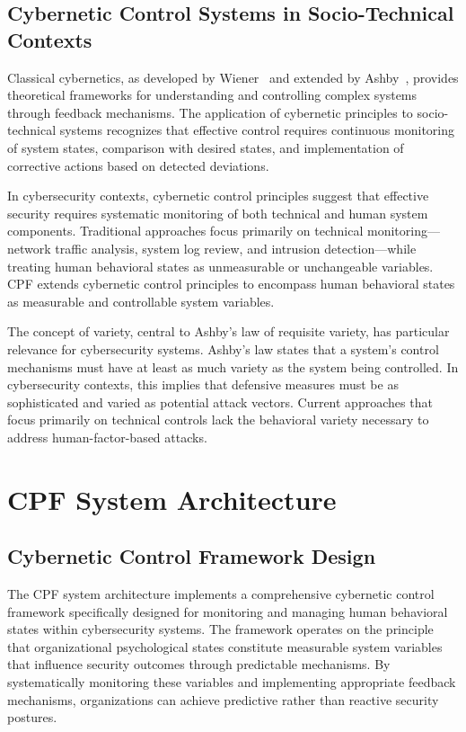 \documentclass[journal]{IEEEtran}
\begin{document}
\subsection{Cybernetic Control Systems in Socio-Technical Contexts}

Classical cybernetics, as developed by Wiener~\cite{wiener1948} and extended by Ashby~\cite{ashby1956}, provides theoretical frameworks for understanding and controlling complex systems through feedback mechanisms. The application of cybernetic principles to socio-technical systems recognizes that effective control requires continuous monitoring of system states, comparison with desired states, and implementation of corrective actions based on detected deviations.

In cybersecurity contexts, cybernetic control principles suggest that effective security requires systematic monitoring of both technical and human system components. Traditional approaches focus primarily on technical monitoring—network traffic analysis, system log review, and intrusion detection—while treating human behavioral states as unmeasurable or unchangeable variables. CPF extends cybernetic control principles to encompass human behavioral states as measurable and controllable system variables.

The concept of variety, central to Ashby's law of requisite variety, has particular relevance for cybersecurity systems. Ashby's law states that a system's control mechanisms must have at least as much variety as the system being controlled. In cybersecurity contexts, this implies that defensive measures must be as sophisticated and varied as potential attack vectors. Current approaches that focus primarily on technical controls lack the behavioral variety necessary to address human-factor-based attacks.

\section{CPF System Architecture}

\subsection{Cybernetic Control Framework Design}

The CPF system architecture implements a comprehensive cybernetic control framework specifically designed for monitoring and managing human behavioral states within cybersecurity systems. The framework operates on the principle that organizational psychological states constitute measurable system variables that influence security outcomes through predictable mechanisms. By systematically monitoring these variables and implementing appropriate feedback mechanisms, organizations can achieve predictive rather than reactive security postures.
\end{document}
